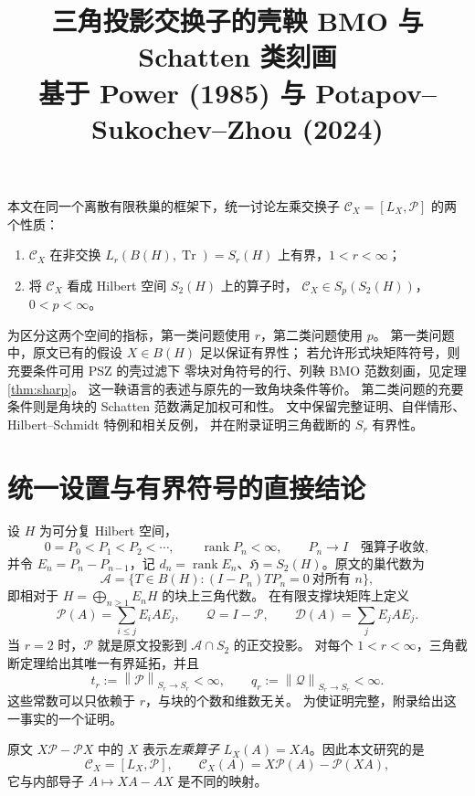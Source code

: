 \documentclass[UTF8,11pt,a4paper,fontset=fandol]{ctexart}
\title{三角投影交换子的壳鞅 BMO 与 Schatten 类刻画\\
\large 基于 Power (1985) 与 Potapov--Sukochev--Zhou (2024)}
\author{}
\date{}
\theoremstyle{remark}
\newcommand{\BH}{B(H)}
\newcommand{\Tr}{\operatorname{Tr}}
\newcommand{\PP}{\mathcal P}
\newcommand{\QQ}{\mathcal Q}
\newcommand{\DD}{\mathcal D}
\newcommand{\Alg}{\mathcal A}
\newcommand{\CC}{\mathcal C}
\newcommand{\norm}[1]{\left\lVert #1\right\rVert}
\DeclareMathOperator{\rank}{rank}
\newcommand{\HS}{\mathfrak H}
\numberwithin{equation}{section}
\begin{document}
\maketitle
\vspace{-2em}

本文在同一个离散有限秩巢的框架下，统一讨论左乘交换子
$\CC_X=[L_X,\PP]$ 的两个性质：
\begin{enumerate}[label=\textup{(\arabic*)}]
 \item $\CC_X$ 在非交换 $L_r(B(H),\Tr)=S_r(H)$ 上有界，$1<r<\infty$；
 \item 将 $\CC_X$ 看成 Hilbert 空间 $S_2(H)$ 上的算子时，
       $\CC_X\in S_p(S_2(H))$，$0<p<\infty$。
\end{enumerate}
为区分这两个空间的指标，第一类问题使用 $r$，第二类问题使用 $p$。
第一类问题中，原文已有的假设 $X\in B(H)$ 足以保证有界性；
若允许形式块矩阵符号，则充要条件可用 PSZ \cite{PSZ} 的壳过滤下
零块对角符号的行、列鞅 BMO 范数刻画，见定理 \ref{thm:sharp}。
这一鞅语言的表述与原先的一致角块条件等价。
第二类问题的充要条件则是角块的 Schatten 范数满足加权可和性。
文中保留完整证明、自伴情形、Hilbert--Schmidt 特例和相关反例，
并在附录证明三角截断的 $S_r$ 有界性。

\section{统一设置与有界符号的直接结论}

设 $H$ 为可分复 Hilbert 空间，
\[
 0=P_0<P_1<P_2<\cdots,\qquad \rank P_n<\infty,
 \qquad P_n\longrightarrow I\quad\text{强算子收敛},
\]
并令 $E_n=P_n-P_{n-1}$，记 $d_n=\rank E_n$、$\HS=S_2(H)$。原文的巢代数为
\[
 \Alg=\{T\in\BH:(I-P_n)TP_n=0\ \text{对所有 }n\},
\]
即相对于 $H=\bigoplus_{n\geq1}E_nH$ 的块上三角代数。
在有限支撑块矩阵上定义
\[
 \PP(A)=\sum_{i\leq j}E_iAE_j,\qquad
 \QQ=I-\PP,\qquad
 \DD(A)=\sum_jE_jAE_j.
\]
当 $r=2$ 时，$\PP$ 就是原文投影到 $\Alg\cap S_2$ 的正交投影。
对每个 $1<r<\infty$，三角截断定理给出其唯一有界延拓，并且
\begin{equation}\label{eq:tp}
 t_r:=\norm{\PP}_{S_r\to S_r}<\infty,\qquad
 q_r:=\norm{\QQ}_{S_r\to S_r}<\infty.
\end{equation}
这些常数可以只依赖于 $r$，与块的个数和维数无关。
为使证明完整，附录给出这一事实的一个证明。

\medskip
原文 $X\PP-\PP X$ 中的 $X$ 表示\emph{左乘算子}
$L_X(A)=XA$。因此本文研究的是
\begin{equation}\label{eq:defC}
 \CC_X=[L_X,\PP],\qquad
 \CC_X(A)=X\PP(A)-\PP(XA),
\end{equation}
它与内部导子 $A\mapsto XA-AX$ 是不同的映射。
\end{document}
